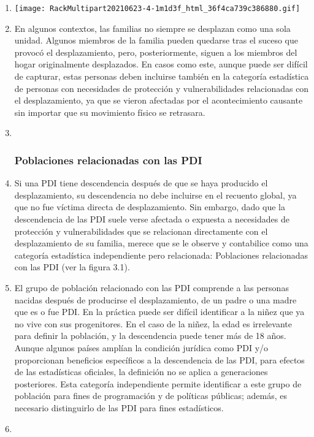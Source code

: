 \documentclass[
]{book}
\begin{document}
\begin{enumerate}
\def\labelenumi{\arabic{enumi}.}
\item
  \texttt{[image: RackMultipart20210623-4-1m1d3f\_html\_36f4ca739c386880.gif]}
\item
  En algunos contextos, las familias no siempre se desplazan como una sola unidad. Algunos miembros de la familia pueden quedarse tras el suceso que provocó el desplazamiento, pero, posteriormente, siguen a los miembros del hogar originalmente desplazados. En casos como este, aunque puede ser difícil de capturar, estas personas deben incluirse también en la categoría estadística de personas con necesidades de protección y vulnerabilidades relacionadas con el desplazamiento, ya que se vieron afectadas por el acontecimiento causante sin importar que su movimiento físico se retrasara.
\item ~
  \hypertarget{poblaciones-relacionadas-con-las-pdi}{%
  \subsubsection{Poblaciones relacionadas con las PDI}\label{poblaciones-relacionadas-con-las-pdi}}
\item
  Si una PDI tiene descendencia después de que se haya producido el desplazamiento, su descendencia no debe incluirse en el recuento global, ya que no fue víctima directa de desplazamiento. Sin embargo, dado que la descendencia de las PDI suele verse afectada o expuesta a necesidades de protección y vulnerabilidades que se relacionan directamente con el desplazamiento de su familia, merece que se le observe y contabilice como una categoría estadística independiente pero relacionada: Poblaciones relacionadas con las PDI (ver la figura 3.1).
\item
  El grupo de población relacionado con las PDI comprende a las personas nacidas después de producirse el desplazamiento, de un padre o una madre que es o fue PDI. En la práctica puede ser difícil identificar a la niñez que ya no vive con sus progenitores. En el caso de la niñez, la edad es irrelevante para definir la población, y la descendencia puede tener más de 18 años. Aunque algunos países amplían la condición jurídica como PDI y/o proporcionan beneficios específicos a la descendencia de las PDI, para efectos de las estadísticas oficiales, la definición no se aplica a generaciones posteriores. Esta categoría independiente permite identificar a este grupo de población para fines de programación y de políticas públicas; además, es necesario distinguirlo de las PDI para fines estadísticos.
\item ~
  \hypertarget{otros-familiares-no-desplazados-de-las-pdi}{%
}
\end{enumerate}
\end{document}
